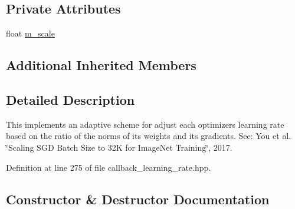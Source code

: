 \subsection*{Private Attributes}
\begin{DoxyCompactItemize}
\item 
float \hyperlink{classlbann_1_1lbann__callback__optimizerwise__adaptive__learning__rate_a332beb0eb4464929248f56e1815d4e69}{m\+\_\+scale}
\end{DoxyCompactItemize}
\subsection*{Additional Inherited Members}


\subsection{Detailed Description}
This implements an adaptive scheme for adjust each optimizer\textquotesingle{}s learning rate based on the ratio of the norms of its weights and its gradients. See\+: You et al. \char`\"{}\+Scaling S\+G\+D Batch Size to 32\+K for Image\+Net
\+Training\char`\"{}, 2017. 

Definition at line 275 of file callback\+\_\+learning\+\_\+rate.\+hpp.



\subsection{Constructor \& Destructor Documentation}
\mbox{\label{classlbann_1_1lbann__callback__optimizerwise__adaptive__learning__rate_a4ab8768ad85fe17728d62eceb628cc9f}} 

